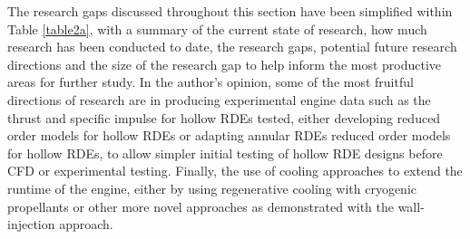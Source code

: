 \documentclass{article}
\begin{document}
The research gaps discussed throughout this section have been simplified within Table \ref{table2a}, with a summary of the current state of research, how much research has been conducted to date, the research gaps, potential future research directions and the size of the research gap to help inform the most productive areas for further study. In the author's opinion, some of the most fruitful directions of research are in producing experimental engine data such as the thrust and specific impulse for hollow RDEs tested, either developing reduced order models for hollow RDEs or adapting annular RDEs reduced order models for hollow RDEs, to allow simpler initial testing of hollow RDE designs before CFD or experimental testing. Finally, the use of cooling approaches to extend the runtime of the engine, either by using regenerative cooling with cryogenic propellants or other more novel approaches as demonstrated with the wall-injection approach.
\par
\end{document}
